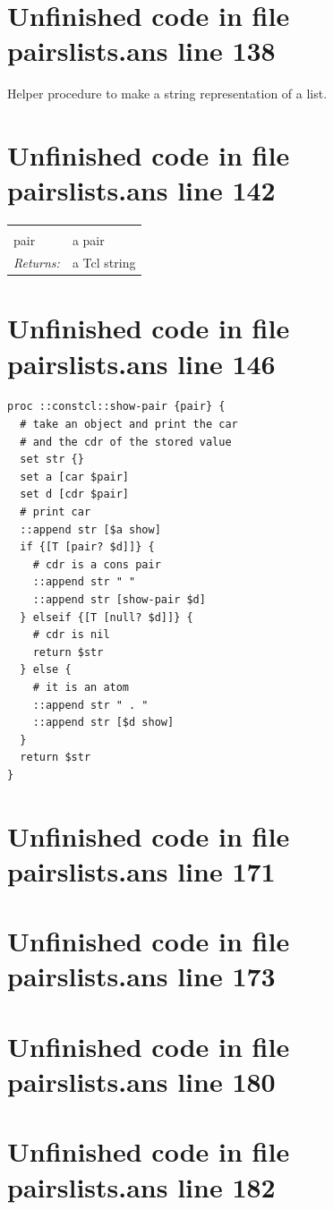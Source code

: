 \documentclass[twoside,9pt]{report}
\begin{document}
\section{Unfinished code in file pairslists.ans line 138}


Helper procedure to make a string representation of a list.

\section{Unfinished code in file pairslists.ans line 142}
\noindent\begin{tabular}{ |p{1.9cm} p{8cm}| }
\hline
\rowcolor[HTML]{CCCCCC} \multicolumn{2}{|l|}{\bf show-pair (internal)} \\
pair & a pair \\
\textit{Returns:} & a Tcl string \\
\hline
\end{tabular}
\section{Unfinished code in file pairslists.ans line 146}
\begin{lstlisting}
proc ::constcl::show-pair {pair} {
  # take an object and print the car
  # and the cdr of the stored value
  set str {}
  set a [car $pair]
  set d [cdr $pair]
  # print car
  ::append str [$a show]
  if {[T [pair? $d]]} {
    # cdr is a cons pair
    ::append str " "
    ::append str [show-pair $d]
  } elseif {[T [null? $d]]} {
    # cdr is nil
    return $str
  } else {
    # it is an atom
    ::append str " . "
    ::append str [$d show]
  }
  return $str
}
\end{lstlisting}
\section{Unfinished code in file pairslists.ans line 171}
\section{Unfinished code in file pairslists.ans line 173}
\section{Unfinished code in file pairslists.ans line 180}
\section{Unfinished code in file pairslists.ans line 182}
\end{document}
